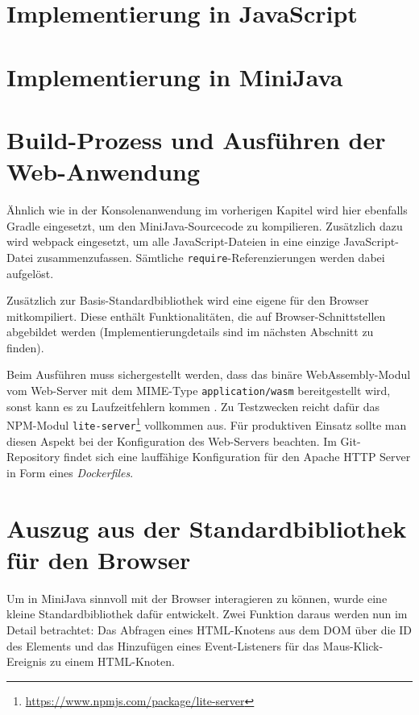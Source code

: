 \section{Implementierung in JavaScript}



\section{Implementierung in MiniJava}





\section{Build-Prozess und Ausführen der Web-Anwendung}

Ähnlich wie in der Konsolenanwendung im vorherigen Kapitel wird hier ebenfalls Gradle eingesetzt, um den MiniJava-Sourcecode zu kompilieren. Zusätzlich dazu wird webpack \cite{Webpack} eingesetzt, um alle JavaScript-Dateien in eine einzige JavaScript-Datei zusammenzufassen. Sämtliche \lstinline{require}-Referenzierungen werden dabei aufgelöst.

Zusätzlich zur Basis-Standardbibliothek wird eine eigene für den Browser mitkompiliert. Diese enthält Funktionalitäten, die auf Browser-Schnittstellen abgebildet werden (Implementierungdetails sind im nächsten Abschnitt zu finden).

Beim Ausführen muss sichergestellt werden, dass das binäre WebAssembly-Modul vom Web-Server mit dem MIME-Type \lstinline{application/wasm} bereitgestellt wird, sonst kann es zu Laufzeitfehlern kommen \cite{MDNWebAssembly}. Zu Testzwecken reicht dafür das NPM-Modul \lstinline{lite-server}\footnote{\url{https://www.npmjs.com/package/lite-server}} vollkommen aus. Für produktiven Einsatz sollte man diesen Aspekt bei der Konfiguration des Web-Servers beachten. Im Git-Repository findet sich eine lauffähige Konfiguration für den Apache HTTP Server in Form eines \emph{Dockerfiles}.

\section{Auszug aus der Standardbibliothek für den Browser}

Um in MiniJava sinnvoll mit der Browser interagieren zu können, wurde eine kleine Standardbibliothek dafür entwickelt. Zwei Funktion daraus werden nun im Detail betrachtet: Das Abfragen eines HTML-Knotens aus dem DOM über die ID des Elements und das Hinzufügen eines Event-Listeners für das Maus-Klick-Ereignis zu einem HTML-Knoten.


